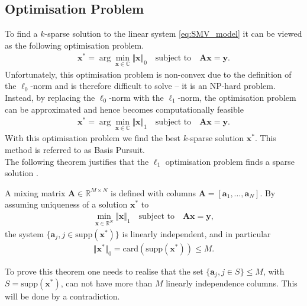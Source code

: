 \subsection{Optimisation Problem}\label{sec:opti}
To find a $k$-sparse solution to the linear system \eqref{eq:SMV_model} it can be viewed as the following optimisation problem. 
\begin{align*}
\mathbf{x}^\ast = \arg \min_{\mathbf{x} \in \mathbb{C}} \Vert \mathbf{x} \Vert_0 \quad \text{subject to} \quad \mathbf{Ax} = \mathbf{y}.
\end{align*}
Unfortunately, this optimisation problem is non-convex due to the definition of the $\ell_0$-norm and is therefore difficult to solve -- it is an NP-hard problem. 
Instead, by replacing the $\ell_0$-norm with the $\ell_1$-norm, the optimisation problem can be approximated and hence becomes computationally feasible \cite[p. 27]{CS}
\begin{align}\label{eq:SMV_p1}
\mathbf{x}^\ast = \arg \min_{\mathbf{x} \in \mathbb{C}} \Vert \mathbf{x} \Vert_1 \quad \text{subject to} \quad \mathbf{Ax} = \mathbf{y}.
\end{align} 
With this optimisation problem we find the best $k$-sparse solution $\mathbf{x}^\ast$. 
This method is referred to as Basis Pursuit. 
\\
The following theorem justifies that the $\ell_1$ optimisation problem finds a sparse solution \cite[p. 62-63]{FR}.
\begin{theorem}
A mixing matrix $\mathbf{A} \in \mathbb{R}^{M \times N}$ is defined with columns $\mathbf{A} = [\mathbf{a}_1, \dots, \mathbf{a}_N]$. 
By assuming uniqueness of a solution $\mathbf{x}^{\ast}$ to
\begin{align*}
\min_{\mathbf{x} \in \mathbb{R}^N} \Vert \mathbf{x} \Vert_1 \quad \text{subject to} \quad \mathbf{Ax} = \mathbf{y},
\end{align*}
the system $\lbrace \mathbf{a}_j, j \in \text{supp}( \mathbf{x}^\ast) \rbrace$ is linearly independent, and in particular
\begin{align*}
\Vert \mathbf{x}^\ast \Vert_0 = \text{card}(\text{supp} (\mathbf{x}^\ast)) \leq M.
\end{align*}
\end{theorem}
To prove this theorem one needs to realise that the set $\lbrace \mathbf{a}_j, j \in S \rbrace \leq M$, with $S = \text{supp}(\mathbf{x}^\ast)$, can not have more than $M$ linearly independence columns. This will be done by a contradiction.
